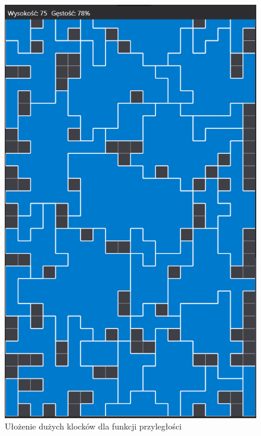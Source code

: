 \documentclass{article}
\begin{document}
\begin{enumerate}
\begin{figure}[H]
\includegraphics[width=\textwidth]{duze_klocki.PNG}
\caption{Ułożenie dużych klocków dla funkcji przyległości}
\end{figure}

\end{enumerate}
\end{document}
